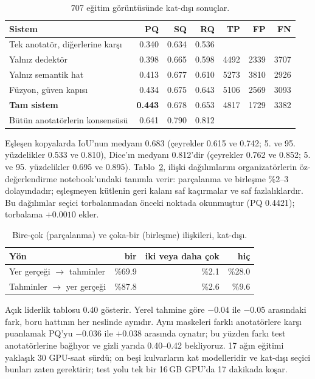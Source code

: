 \documentclass[sigconf]{acmart}
\begin{document}
\begin{table}[t]
  \caption{707 eğitim görüntüsünde kat-dışı sonuçlar.}
  \label{tab:results}
  \small\setlength{\tabcolsep}{3.6pt}
  \begin{tabular}{@{}lrrrrrr@{}}
    \toprule
    Sistem & PQ & SQ & RQ & TP & FP & FN \\
    \midrule
    Tek anotatör, diğerlerine karşı & 0.340 & 0.634 & 0.536 & & & \\
    Yalnız dedektör & 0.398 & 0.665 & 0.598 & 4492 & 2339 & 3707 \\
    Yalnız semantik hat & 0.413 & 0.677 & 0.610 & 5273 & 3810 & 2926 \\
    Füzyon, güven kapısı & 0.434 & 0.675 & 0.643 & 5106 & 2569 & 3093 \\
    \textbf{Tam sistem} & \textbf{0.443} & 0.678 & 0.653 & 4817 & 1729 & 3382 \\
    Bütün anotatörlerin konsensüsü & 0.641 & 0.790 & 0.812 & & & \\
    \bottomrule
  \end{tabular}
\end{table}

Eşleşen kopyalarda IoU'nun medyanı 0.683 (çeyrekler 0.615 ve 0.742; 5. ve 95. yüzdelikler 0.533 ve 0.810), Dice'ın medyanı 0.812'dir (çeyrekler 0.762 ve 0.852; 5. ve 95. yüzdelikler 0.695 ve 0.895). Tablo~\ref{tab:relations}, ilişki dağılımlarını organizatörlerin öz-değerlendirme notebook'undaki tanımla verir: parçalanma ve birleşme \%2--3 dolayındadır; eşleşmeyen kütlenin geri kalanı saf kaçırmalar ve saf fazlalıklardır. Bu dağılımlar seçici torbalanmadan önceki noktada okunmuştur (PQ 0.4421); torbalama $+0.0010$ ekler.

\begin{table}[t]
  \caption{Bire-çok (parçalanma) ve çoka-bir (birleşme) ilişkileri, kat-dışı.}
  \label{tab:relations}
  \small
  \begin{tabular}{@{}lrrr@{}}
    \toprule
    Yön & bir & iki veya daha çok & hiç \\
    \midrule
    Yer gerçeği $\rightarrow$ tahminler & \%69.9 & \%2.1 & \%28.0 \\
    Tahminler $\rightarrow$ yer gerçeği & \%87.8 & \%2.6 & \%9.6 \\
    \bottomrule
  \end{tabular}
\end{table}

Açık liderlik tablosu 0.40 gösterir. Yerel tahmine göre $-0.04$ ile $-0.05$ arasındaki fark, boru hattının her neslinde aynıdır. Aynı maskeleri farklı anotatörlere karşı puanlamak PQ'yu $-0.036$ ile $+0.038$ arasında oynatır; bu yüzden farkı test anotatörlerine bağlıyor ve gizli yarıda 0.40--0.42 bekliyoruz. 17 ağın eğitimi yaklaşık 30 GPU-saat sürdü; on beşi kulvarların kat modelleridir ve kat-dışı seçici bunları zaten gerektirir; test yolu tek bir 16\,GB GPU'da 17 dakikada koşar.
\end{document}
